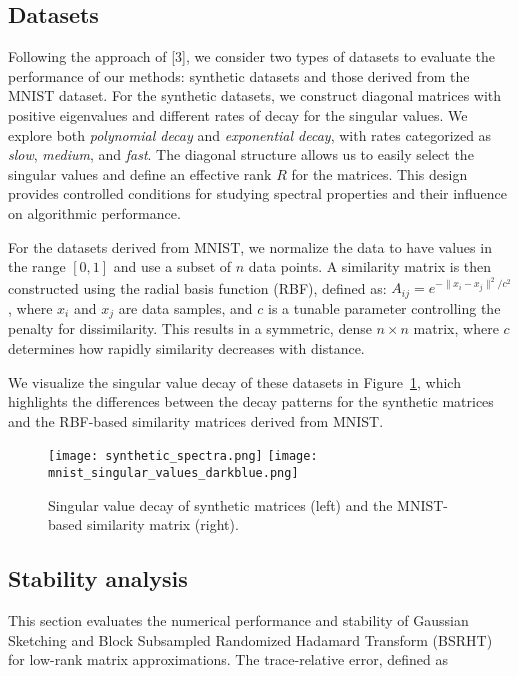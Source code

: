 \documentclass[a4paper, 12pt,oneside]{article}
\begin{document}
		\subsection{Datasets}
		Following the approach of [3], we consider two types of datasets to evaluate the performance of our methods: synthetic datasets and those derived from the MNIST dataset. For the synthetic datasets, we construct diagonal matrices with positive eigenvalues and different rates of decay for the singular values. We explore both \textit{polynomial decay} and \textit{exponential decay}, with rates categorized as \textit{slow}, \textit{medium}, and \textit{fast}. The diagonal structure allows us to easily select the singular values and define an effective rank \( R \) for the matrices. This design provides controlled conditions for studying spectral properties and their influence on algorithmic performance.

	For the datasets derived from MNIST, we normalize the data to have values in the range \([0, 1]\) and use a subset of \( n \) data points. A similarity matrix is then constructed using the radial basis function (RBF), defined as:
	$A_{ij} = e^{-\|x_i - x_j\|^2 / c^2}$, where \( x_i \) and \( x_j \) are data samples, and \( c \) is a tunable parameter controlling the penalty for dissimilarity. This results in a symmetric, dense \( n \times n \) matrix, where \( c \) determines how rapidly similarity decreases with distance. 

	We visualize the singular value decay of these datasets in Figure~\ref{fig:singular_value_comparison}, which highlights the differences between the decay patterns for the synthetic matrices and the RBF-based similarity matrices derived from MNIST.
	\begin{figure}[H]
		\centering
		\texttt{[image: synthetic\_spectra.png]}
		\hspace{0.02\textwidth} %
		\texttt{[image: mnist\_singular\_values\_darkblue.png]}
		\caption{Singular value decay of synthetic matrices (left) and the MNIST-based similarity matrix (right).}
		\label{fig:singular_value_comparison}
	\end{figure}
		\subsection{Stability analysis}
		This section evaluates the numerical performance and stability of Gaussian Sketching and Block Subsampled Randomized Hadamard Transform (BSRHT) for low-rank matrix approximations. The trace-relative error, defined as 
\end{document}
